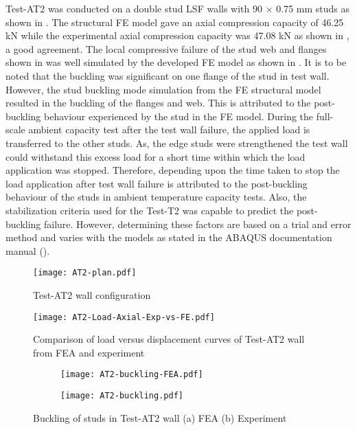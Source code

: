 Test-AT2 was conducted on a double stud LSF walls with 90 $\times$ 0.75 mm studs as shown in . The structural FE model gave an axial compression capacity of 46.25 kN while the experimental axial compression capacity was 47.08 kN as shown in , a good agreement. The local compressive failure of the stud web and flanges shown in  was well simulated by the developed FE model as shown in . It is to be noted that the buckling was significant on one flange of the stud in test wall. However, the stud buckling mode simulation from the FE structural model resulted in the buckling of the flanges and web. This is attributed to the post-buckling behaviour experienced by the stud in the FE model. During the full-scale ambient capacity test after the test wall failure, the applied load is transferred to the other studs. As, the edge studs were strengthened the test wall could withstand this excess load for a short time within which the load application was stopped. Therefore, depending upon the time taken to stop the load application after test wall failure is attributed to the post-buckling behaviour of the studs in ambient temperature capacity tests. Also, the stabilization criteria used for the Test-T2 was capable to predict the post-buckling failure. However, determining these factors are based on a trial and error method and varies with the models as stated in the ABAQUS documentation manual (\cite{abaqus2017}).   
\begin{figure}[!htbp]
	\centering
			\texttt{[image: AT2-plan.pdf]}\\
		\caption{Test-AT2 wall configuration}
		\label{fig:AT2-plan-fea}
\end{figure}
\begin{figure}[!htbp]
	\centering
			\texttt{[image: AT2-Load-Axial-Exp-vs-FE.pdf]}\\
		\caption{Comparison of load versus displacement curves of Test-AT2 wall from FEA and experiment}
		\label{fig:AT2-fea-results}
\end{figure}
\begin{figure}[!htbp]
	\centering
	\begin{subfigure}[b]{0.4\textwidth}
		\centering
		\texttt{[image: AT2-buckling-FEA.pdf]}
		\caption{}
		\label{subfig:AT2-buckling-FEA}
	\end{subfigure}
	\begin{subfigure}[b]{0.4\textwidth}
		\centering
		\texttt{[image: AT2-buckling.pdf]}
		\caption{}
		\label{subfig:AT2-buckling-experiment}
	\end{subfigure}
	   \caption{Buckling of studs in Test-AT2 wall (a) FEA (b) Experiment}
	   \label{fig:AT2-buckling-fea-comparison}
\end{figure} 

